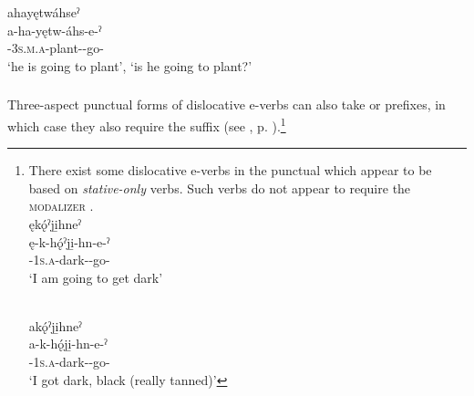 \ex ahayętwáhseˀ \\
\gll a-ha-yętw-áhs-e-ˀ\\
{\factual}-\textsc{3s.m.a}-plant-{\dislocative}-go-{\punctual}\\
\glt ‘he is going to plant’, `is he going to plant?'


\z
\z

\newpage
\subsubsection*{}
Three-aspect punctual forms of dislocative e-verbs can also take  \textsc{\future}  or  \textsc{\indefinite}  prefixes, in which case they also require the  \textsc{\modalizer} suffix (see , p. \pageref{figtab:1:dislpunc}).\footnote{There
    exist some dislocative e-verbs in the punctual which appear to be based on \emph{stative-only} verbs. Such verbs do not appear to require the \textsc{modalizer} .
    \ea\label{ex:dislpurpfacex80}
    \ea {} \\
    ękǫ́ˀji̱hneˀ\\
    \gll ę-k-hǫ́ˀji̱-hn-e-ˀ\\
    \fut-\textsc{1s.a}-dark-{\dislocative}-go-{\punctual}\\
    \glt `I am going to get dark'

    \ex {} \\
    akǫ́ˀji̱hneˀ\\
	    \gll a-k-hǫ́ji̱-hn-e-ˀ\\
	    {\factual}-\textsc{1s.a}-dark-{\dislocative}-go-{\punctual}\\
	    \glt `I got dark, black (really tanned)'

    \z
    \z
}


